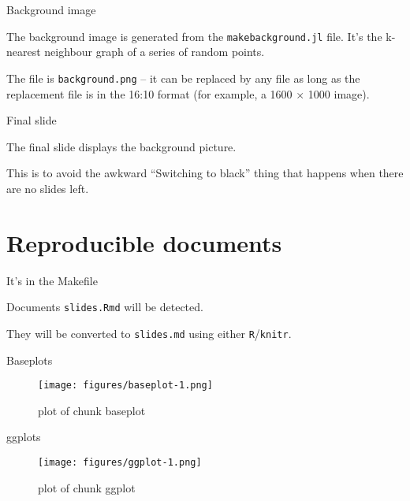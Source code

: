 \documentclass[11pt, compress, aspectratio=1610]{beamer}
\let\OldTexttt\texttt
\renewcommand{\texttt}[1]{\OldTexttt{\color{plTT}#1}}
\begin{document}
\begin{frame}[fragile]{Background image}

The background image is generated from the \texttt{makebackground.jl}
file. It's the k-nearest neighbour graph of a series of random points.

The file is \texttt{background.png} -- it can be replaced by any file
\alert{as long
as} the replacement file is in the 16:10 format (for example, a 1600
\(\times\) 1000 image).

\end{frame}

\begin{frame}{Final slide}

The final slide displays the background picture.

This is to avoid the awkward ``Switching to black'' thing that happens
when there are no slides left.

\end{frame}

\section{Reproducible documents}\label{reproducible-documents}

\begin{frame}[fragile]{It's in the Makefile}

Documents \texttt{slides.Rmd} will be detected.

They will be converted to \texttt{slides.md} using either
\texttt{R}/\texttt{knitr}.

\end{frame}

\begin{frame}{Baseplots}

\begin{figure}
\centering
\texttt{[image: figures/baseplot-1.png]}
\caption{plot of chunk baseplot}
\end{figure}

\end{frame}

\begin{frame}{ggplots}

\begin{figure}
\centering
\texttt{[image: figures/ggplot-1.png]}
\caption{plot of chunk ggplot}
\end{figure}

\end{frame}
\end{document}
